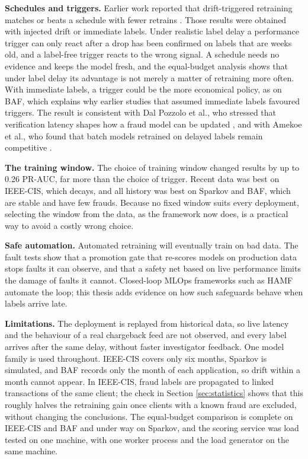 \textbf{Schedules and triggers.} Earlier work reported that drift-triggered retraining matches or beats a schedule with fewer retrains \cite{wong2025,yelleti2025}. Those results were obtained with injected drift or immediate labels. Under realistic label delay a performance trigger can only react after a drop has been confirmed on labels that are weeks old, and a label-free trigger reacts to the wrong signal. A schedule needs no evidence and keeps the model fresh, and the equal-budget analysis shows that under label delay its advantage is not merely a matter of retraining more often. With immediate labels, a trigger could be the more economical policy, as on BAF, which explains why earlier studies that assumed immediate labels favoured triggers. The result is consistent with Dal Pozzolo et al., who stressed that verification latency shapes how a fraud model can be updated \cite{dalpozzolo2018}, and with Amekoe et al., who found that batch models retrained on delayed labels remain competitive \cite{amekoe2024}.

\textbf{The training window.} The choice of training window changed results by up to 0.26 PR-AUC, far more than the choice of trigger. Recent data was best on IEEE-CIS, which decays, and all history was best on Sparkov and BAF, which are stable and have few frauds. Because no fixed window suits every deployment, selecting the window from the data, as the framework now does, is a practical way to avoid a costly wrong choice.

\textbf{Safe automation.} Automated retraining will eventually train on bad data. The fault tests show that a promotion gate that re-scores models on production data stops faults it can observe, and that a safety net based on live performance limits the damage of faults it cannot. Closed-loop MLOps frameworks such as HAMF \cite{reda2025} automate the loop; this thesis adds evidence on how such safeguards behave when labels arrive late.

\textbf{Limitations.} The deployment is replayed from historical data, so live latency and the behaviour of a real chargeback feed are not observed, and every label arrives after the same delay, without faster investigator feedback. One model family is used throughout. IEEE-CIS covers only six months, Sparkov is simulated, and BAF records only the month of each application, so drift within a month cannot appear. In IEEE-CIS, fraud labels are propagated to linked transactions of the same client; the check in Section \ref{sec:statistics} shows that this roughly halves the retraining gain once clients with a known fraud are excluded, without changing the conclusions. The equal-budget comparison is complete on IEEE-CIS and BAF and under way on Sparkov, and the scoring service was load tested on one machine, with one worker process and the load generator on the same machine.
